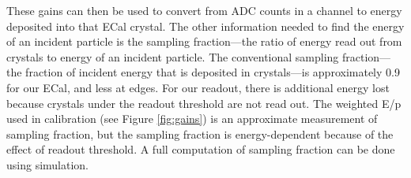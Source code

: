 These gains can then be used to convert from ADC counts in a channel to energy deposited into that ECal crystal.
The other information needed to find the energy of an incident particle is the sampling fraction---the ratio of energy read out from crystals to energy of an incident particle.
The conventional sampling fraction---the fraction of incident energy that is deposited in crystals---is approximately 0.9 for our ECal, and less at edges.
For our readout, there is additional energy lost because crystals under the readout threshold are not read out.
The weighted E/p used in calibration (see Figure \ref{fig:gains}) is an approximate measurement of sampling fraction, but the sampling fraction is energy-dependent because of the effect of readout threshold. 
A full computation of sampling fraction can be done using simulation.
